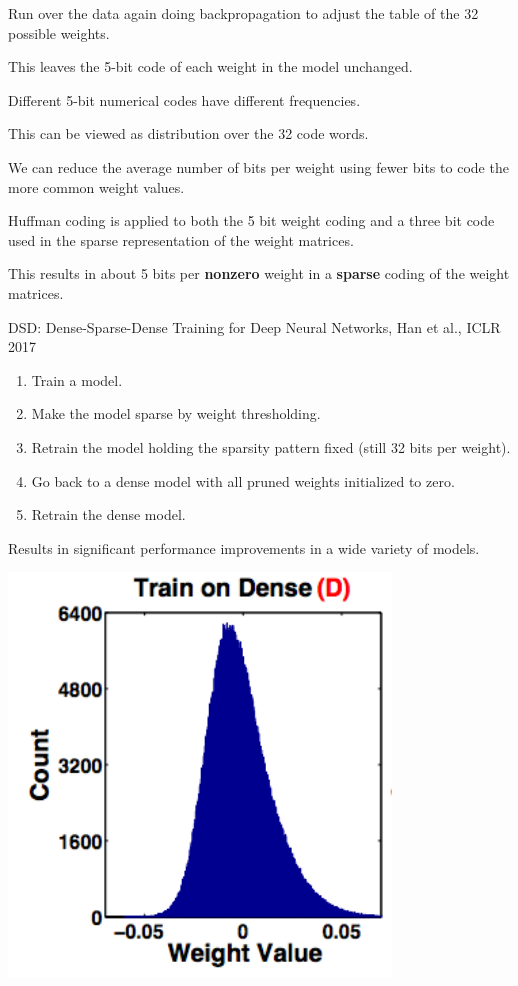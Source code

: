 {

Run over the data again doing backpropagation to adjust the table of the 32 possible weights.

\vfill
This leaves the 5-bit code of each weight in the model unchanged.


Different 5-bit numerical codes have different frequencies.

\vfill
This can be viewed as distribution over the 32 code words.

\vfill
We can reduce the average number of bits per weight using fewer bits to code the more common weight values.

\vfill
Huffman coding is applied to both the 5 bit weight coding and a three bit code used in the sparse representation of the weight matrices.

\vfill
This results in about 5 bits  per {\bf nonzero} weight in a {\bf sparse} coding of the weight matrices.


DSD: Dense-Sparse-Dense Training for Deep
Neural Networks, Han et al., ICLR 2017

\vfill
\begin{enumerate}
\item Train a model.

  \vfill
\item Make the model sparse by weight thresholding.

  \vfill
\item Retrain the model holding the sparsity pattern fixed (still 32 bits per weight).

  \vfill
\item Go back to a dense model with all pruned weights initialized to zero.

  \vfill
\item  Retrain the dense model.
\end{enumerate}

Results in significant performance improvements in a wide variety of models.


\vfill
\centerline{\includegraphics[width = 4in]{../images/DSD1}}

}

